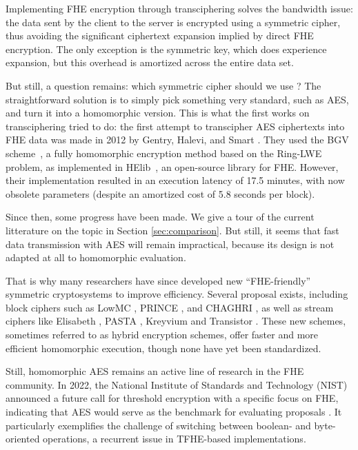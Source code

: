 Implementing \gls{FHE} encryption through transciphering solves the bandwidth issue: the data sent by the client to the server is encrypted using a symmetric cipher, thus avoiding the significant ciphertext 
expansion implied by direct \gls{FHE} encryption. The only exception is the symmetric key, which does experience expansion, but this overhead is amortized across the entire data set.

But still, a question remains: which symmetric cipher should we use ? The straightforward solution is to simply pick something very standard, such as \gls{AES}, and turn it into a homomorphic version. This is what the first works on transciphering tried to do: the first attempt to transcipher \gls{AES} ciphertexts into \gls{FHE} data was made in 2012 by Gentry, Halevi, and Smart \cite{C:GenHalSma12}. They used the BGV scheme~\cite{ITCS:BraGenVai12}, a fully homomorphic encryption method based on the Ring-LWE problem, as implemented in HElib~\cite{EPRINT:HalSho20}, an open-source library for \gls{FHE}. However, their implementation resulted in an execution latency of 17.5 minutes, with now obsolete parameters (despite an amortized cost of 5.8 seconds per block).

Since then, some progress have been made. We give a tour of the current litterature on the topic in Section \ref{sec:comparison}. But still, it seems that fast data transmission with \gls{AES} will remain impractical, because its design is not adapted at all to homomorphic evaluation.


That is why many researchers have since developed new ``\gls{FHE}-friendly'' symmetric cryptosystems to improve efficiency. Several proposal exists, including block ciphers such as LowMC \cite{EC:ARSTZ15}, PRINCE \cite{AC:BCGKKK12}, and CHAGHRI \cite{CCS:AshMahTop22}, as well as stream ciphers like Elisabeth \cite{AC:CHMS22}, PASTA \cite{TCHES:DGHRSW23}, Kreyvium \cite{FSE:CCFLNP16} and Transistor \cite{transistor}. These new schemes, sometimes referred to as hybrid encryption schemes, offer faster and more efficient homomorphic execution, though none have yet been standardized.


Still, homomorphic \gls{AES} remains an active line of research in the \gls{FHE} community. In 2022, the National Institute of Standards and Technology (NIST) announced a future call for threshold encryption with a specific focus on \gls{FHE}, indicating that \gls{AES} would serve as the benchmark for evaluating proposals \cite{call_nist}. It particularly exemplifies the challenge of switching between boolean- and byte-oriented operations, a recurrent issue in \gls{TFHE}-based implementations.



